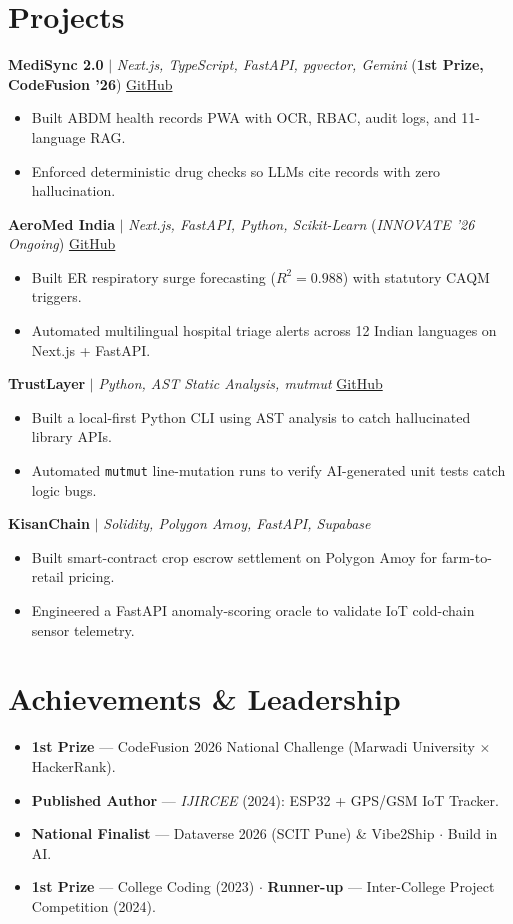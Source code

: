 \documentclass[a4paper,11pt]{article}
\newcommand{\resumeItemListStart}{\begin{itemize}[leftmargin=0.14in,label=\textbullet,topsep=2pt plus 1pt,itemsep=2pt plus 1pt,parsep=0pt]}
\newcommand{\resumeItemListEnd}{\end{itemize}}
\begin{document}
\section{Projects}
\noindent\textbf{MediSync 2.0} $|$ {\small\textit{Next.js, TypeScript, FastAPI, pgvector, Gemini}} ({\small\textbf{1st Prize, CodeFusion '26}}) \hfill {\small\href{https://github.com/Suyash728/MediSync}{\color{navy}GitHub}}
\resumeItemListStart
  \item Built ABDM health records PWA with OCR, RBAC, audit logs, and 11-language RAG.
  \item Enforced deterministic drug checks so LLMs cite records with zero hallucination.
\resumeItemListEnd
\vspace{3.5pt plus 1.5pt minus 1pt}
\noindent\textbf{AeroMed India} $|$ {\small\textit{Next.js, FastAPI, Python, Scikit-Learn}} ({\small\textit{INNOVATE '26 Ongoing}}) \hfill {\small\href{https://github.com/Suyash728/aeromed-india}{\color{navy}GitHub}}
\resumeItemListStart
  \item Built ER respiratory surge forecasting ($R^2 = 0.988$) with statutory CAQM triggers.
  \item Automated multilingual hospital triage alerts across 12 Indian languages on Next.js + FastAPI.
\resumeItemListEnd
\vspace{3.5pt plus 1.5pt minus 1pt}
\noindent\textbf{TrustLayer} $|$ {\small\textit{Python, AST Static Analysis, mutmut}} \hfill {\small\href{https://github.com/Suyash728/trustlayer}{\color{navy}GitHub}}
\resumeItemListStart
  \item Built a local-first Python CLI using AST analysis to catch hallucinated library APIs.
  \item Automated \texttt{mutmut} line-mutation runs to verify AI-generated unit tests catch logic bugs.
\resumeItemListEnd
\vspace{3.5pt plus 1.5pt minus 1pt}
\noindent\textbf{KisanChain} $|$ {\small\textit{Solidity, Polygon Amoy, FastAPI, Supabase}}
\resumeItemListStart
  \item Built smart-contract crop escrow settlement on Polygon Amoy for farm-to-retail pricing.
  \item Engineered a FastAPI anomaly-scoring oracle to validate IoT cold-chain sensor telemetry.
\resumeItemListEnd

\section{Achievements \& Leadership}
\resumeItemListStart
  \item \textbf{1st Prize} --- CodeFusion 2026 National Challenge (Marwadi University $\times$ HackerRank).
  \item \textbf{Published Author} --- \textit{IJIRCEE} (2024): ESP32 + GPS/GSM IoT Tracker.
  \item \textbf{National Finalist} --- Dataverse 2026 (SCIT Pune) \& Vibe2Ship $\cdot$ Build in AI.
  \item \textbf{1st Prize} --- College Coding (2023) $\cdot$ \textbf{Runner-up} --- Inter-College Project Competition (2024).
\resumeItemListEnd
\end{document}
